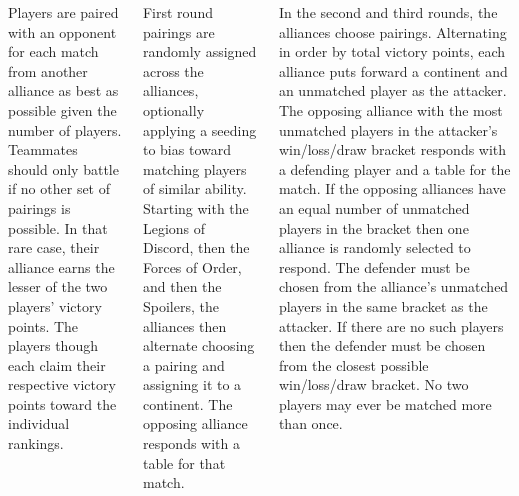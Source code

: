 \begin{columns}
\pagebreak
{}

Players are paired with an opponent for each match from another
alliance as best as possible given the number of players.  Teammates
should only battle if no other set of pairings is possible.  In that
rare case, their alliance earns the lesser of the two players' victory
points.  The players though each claim their respective victory points
toward the individual rankings.

First round pairings are randomly assigned across the alliances,
optionally applying a seeding to bias toward matching players of
similar ability.  Starting with the Legions of Discord, then the
Forces of Order, and then the Spoilers, the alliances then alternate
choosing a pairing and assigning it to a continent.  The opposing
alliance responds with a table for that match.

In the second and third rounds, the alliances choose pairings.
Alternating in order by total victory points, each alliance puts
forward a continent and an unmatched player as the attacker.  The
opposing alliance with the most unmatched players in the attacker's
win/loss/draw bracket responds with a defending player and a table for
the match.  If the opposing alliances have an equal number of
unmatched players in the bracket then one alliance is randomly
selected to respond.  The defender must be chosen from the alliance's
unmatched players in the same bracket as the attacker.  If there are
no such players then the defender must be chosen from the closest
possible win/loss/draw bracket.  No two players may ever be matched
more than once.


%


\end{columns}
